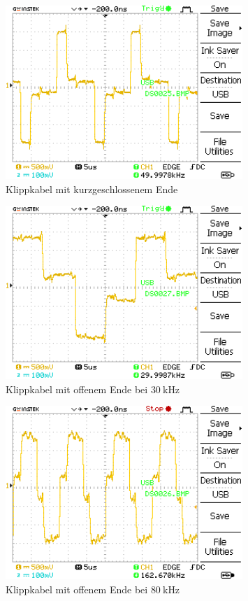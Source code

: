 \documentclass{article}
\begin{document}
				\begin{figure}[H]
					\centering
					\includegraphics[width=0.8\textwidth]{MesswerteVersuch1/DS0025.png}
					\caption{Klippkabel mit kurzgeschlossenem Ende}
					\label{fig:DS0025}
				\end{figure}

				\begin{figure}[H]
					\centering
					\includegraphics[width=0.8\textwidth]{MesswerteVersuch1/DS0027.png}
					\caption{Klippkabel mit offenem Ende bei $\SI{30}{\kilo\hertz}$}
					\label{fig:DS0030}
				\end{figure}

				\begin{figure}[H]
					\centering
					\includegraphics[width=0.8\textwidth]{MesswerteVersuch1/DS0026.png}
					\caption{Klippkabel mit offenem Ende bei $\SI{80}{\kilo\hertz}$}
					\label{fig:DS0030}
				\end{figure}
\end{document}
